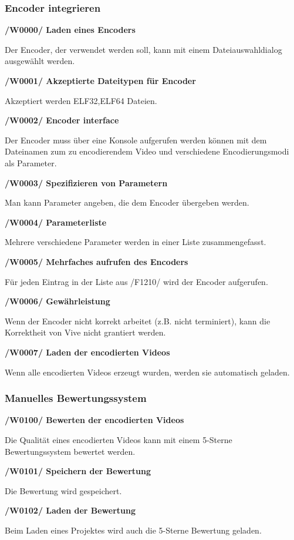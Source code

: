 \documentclass[parskip=full]{scrartcl}
\begin{document}
\subsubsection{Encoder integrieren}
\textbf{/W0000/ Laden eines Encoders}

Der Encoder, der verwendet werden soll, kann mit einem Dateiauswahldialog ausgewählt werden.

\textbf{/W0001/ Akzeptierte Dateitypen für Encoder}

Akzeptiert werden ELF32,ELF64 Dateien.

\newpage
\textbf{/W0002/ Encoder interface}

Der Encoder muss über eine Konsole aufgerufen werden können mit dem Dateinamen zum zu encodierendem Video und verschiedene Encodierungsmodi als Parameter.

\textbf{/W0003/ Spezifizieren von Parametern}

Man kann Parameter angeben, die dem Encoder übergeben werden.

\textbf{/W0004/ Parameterliste}

Mehrere verschiedene Parameter werden in einer Liste zusammengefasst.

\textbf{/W0005/ Mehrfaches aufrufen des Encoders}

Für jeden Eintrag in der Liste aus /F1210/ wird der Encoder aufgerufen.

\textbf{/W0006/ Gewährleistung}

Wenn der Encoder nicht korrekt arbeitet (z.B. nicht terminiert), kann die Korrektheit von Vive nicht grantiert werden.

\textbf{/W0007/ Laden der encodierten Videos}

Wenn alle encodierten Videos erzeugt wurden, werden sie automatisch geladen.

\subsubsection{Manuelles Bewertungssystem}
\textbf{/W0100/ Bewerten der encodierten Videos}

Die Qualität eines encodierten Videos kann mit einem 5-Sterne Bewertungssystem bewertet werden.

\textbf{/W0101/ Speichern der Bewertung}

Die Bewertung wird gespeichert.

\textbf{/W0102/ Laden der Bewertung}

Beim Laden eines Projektes wird auch die 5-Sterne Bewertung geladen.
\end{document}
